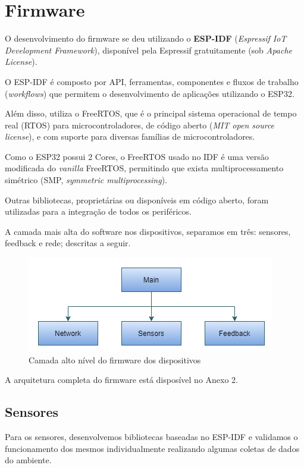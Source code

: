 \documentclass[../monografia.tex]{subfiles}
\begin{document}
\section{Firmware}

O desenvolvimento do firmware se deu utilizando o \textbf{ESP-IDF} (\textit{Espressif IoT Development Framework}), disponível pela Espressif\cite{esp-idf} gratuitamente (sob \textit{Apache License}). 

O ESP-IDF é composto por API, ferramentas, componentes e fluxos de trabalho (\textit{workflows}) que permitem o desenvolvimento de aplicações utilizando o ESP32. 

Além disso, utiliza o FreeRTOS, que é o principal sistema operacional de tempo real (RTOS) para microcontroladores\cite{freertos}, de código aberto (\textit{MIT open source license}), e com suporte para diversas famílias de microcontroladores.

Como o ESP32 possui 2 Cores, o FreeRTOS usado no IDF é uma versão modificada do \textit{vanilla} FreeRTOS, permitindo que exista multiprocessamento simétrico (SMP, \textit{symmetric multiprocessing}).

Outras bibliotecas, proprietárias ou disponíveis em código aberto, foram utilizadas para a integração de todos os periféricos. 

A camada mais alta do software nos dispositivos, separamos em três: sensores, feedback e rede; descritas a seguir. %

\begin{figure}[h!]
	\centering
	\includegraphics[scale=0.8]{fw-arch-1}
	\caption{Camada alto nível do firmware dos dispositivos}
	\label{fig:fw-arch}
\end{figure}

A arquitetura completa do firmware está disposível no Anexo 2. %

\subsection{Sensores}

Para os sensores, desenvolvemos bibliotecas baseadas no ESP-IDF e validamos o funcionamento dos mesmos individualmente realizando algumas coletas de dados do ambiente. 
\end{document}
